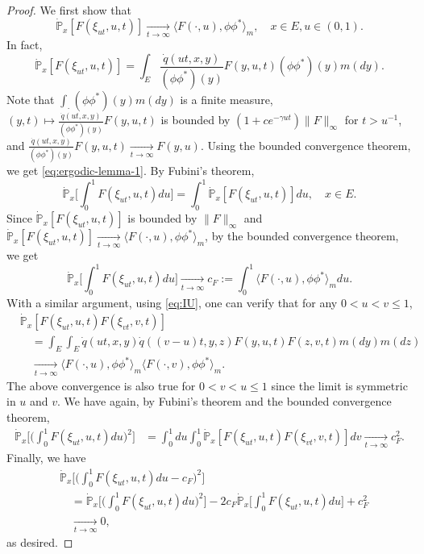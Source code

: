 \begin{proof}
\par
	We first show that
\begin{equation}\label{eq:ergodic-lemma-1}
	\dot{\mathbb P}_x[F(\xi_{ut},u,t)]
	\xrightarrow[t\to\infty]{} \langle F(\cdot,u),\phi\phi^*\rangle_m,
      \quad x\in E, u\in(0,1).
\end{equation}
	In fact,
\[
	\dot{\mathbb P}_x[F(\xi_{ut},u,t)]
	=\int_E \frac{\dot{q}(ut,x,y)}{(\phi\phi^*)(y)}F(y,u,t)(\phi\phi^*)(y)m(dy).
\]
	Note that $\int_\cdot (\phi\phi^*)(y)m(dy)$ is a finite measure, $(y,t)\mapsto \frac{\dot{q}(ut,x,y)}{(\phi\phi^*)(y)}F(y,u,t)$ is bounded by $(1+ce^{-\gamma ut})\|F\|_\infty$ for $t>u^{-1}$, and $\frac{\dot{q}(ut,x,y)}{(\phi\phi^*)(y)}F(y,u,t)\xrightarrow[t\to\infty]{}F(y,u)$.
	Using the bounded convergence theorem, we get \eqref{eq:ergodic-lemma-1}.
	By Fubini's theorem,
\[
	\dot{\mathbb P}_x\big[\int_0^1F(\xi_{ut},u,t)du\big]
	=\int_0^1\dot{\mathbb P}_x[F(\xi_{ut},u,t)]du,
	\quad x\in E.
\]
	Since $\dot{\mathbb P}_x[F(\xi_{ut},u,t)]$ is bounded by $\|F\|_\infty$ and $\dot{\mathbb P}_x[F(\xi_{ut},u,t)]\xrightarrow[t\to\infty]{}\langle F(\cdot, u),\phi\phi^*\rangle_m$, by the bounded convergence theorem, we get
\[
	\dot{\mathbb P}_x\big[\int_0^1F(\xi_{ut},u,t)du\big]
	\xrightarrow[t\to\infty]{} c_F
	:=\int_0^1\langle F(\cdot,u),\phi\phi^*\rangle_mdu.
\]
	With a similar argument, using \eqref{eq:IU}, one can verify that for any $0< u< v\leq 1$,
\[\begin{split}
	&\dot{\mathbb P}_x[F(\xi_{ut},u,t)F(\xi_{vt},v,t)]\\
	&\quad=\int_E\int_E  \dot{q}(ut,x,y) \dot{q}((v-u)t,y,z)F(y,u,t)F(z,v,t)m(dy)m(dz)\\
	&\quad\xrightarrow[t\to\infty]{} \langle F(\cdot,u),\phi\phi^*\rangle_m \langle F(\cdot,v),\phi\phi^*\rangle_m.
\end{split}\]
	The above convergence is also true for $0< v < u\leq 1$ since the limit is symmetric in $u$ and $v$.
	We have again, by Fubini's theorem and the bounded convergence theorem,
\[\begin{split}
	\dot{\mathbb P}_x\Big[\big(\int_0^1 F(\xi_{ut},u,t)du\big)^2\Big]
	&=\int_0^1du\int_0^1\dot{\mathbb P}_x[F(\xi_{ut},u,t)F(\xi_{vt},v,t)]dv\xrightarrow[t\to\infty]{} c_F^2.
\end{split}\]
	Finally, we have
\[\begin{split}
	&\dot{\mathbb P}_x\Big[\big(\int_0^1 F(\xi_{ut},u,t)du - c_F\big)^2\Big]\\
	&\quad =\dot{\mathbb P}_x\Big[\big(\int_0^1 F(\xi_{ut},u,t)du\big)^2\Big] -2c_F \dot{\mathbb P}_x\Big[\int_0^1 F(\xi_{ut},u,t)du\Big]+ c_F^2\\
	&\quad \xrightarrow[t\to\infty]{} 0,
\end{split}\]
	as desired.
\end{proof}

